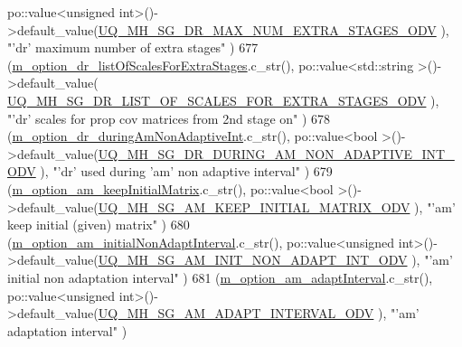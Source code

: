 \begin{DoxyCode}
      po::value<unsigned int>()->default\_value(\hyperlink{_metropolis_hastings_s_g_options_8h_a25f2d316e9719add171ab659591132a3}{UQ\_MH\_SG\_DR\_MAX\_NUM\_EXTRA\_STAGES\_ODV}       
                        ), \textcolor{stringliteral}{"'dr' maximum number of extra stages"}                        )
677     (\hyperlink{class_q_u_e_s_o_1_1_metropolis_hastings_s_g_options_a23025b02dde1763feed23f53a6549ac0}{m\_option\_dr\_listOfScalesForExtraStages}.c\_str(),              
      po::value<std::string >()->default\_value(
      \hyperlink{_metropolis_hastings_s_g_options_8h_a64c475d35150a5d123a7224c59f542b4}{UQ\_MH\_SG\_DR\_LIST\_OF\_SCALES\_FOR\_EXTRA\_STAGES\_ODV}             
       ), \textcolor{stringliteral}{"'dr' scales for prop cov matrices from 2nd stage on"}        )
678     (\hyperlink{class_q_u_e_s_o_1_1_metropolis_hastings_s_g_options_a86c8a503d026c8a112de8cfcb30e3a08}{m\_option\_dr\_duringAmNonAdaptiveInt}.c\_str(),                  
      po::value<bool        >()->default\_value(\hyperlink{_metropolis_hastings_s_g_options_8h_ab1c7c652caf08c08976fb716c0747136}{UQ\_MH\_SG\_DR\_DURING\_AM\_NON\_ADAPTIVE\_INT\_ODV}
                         ), \textcolor{stringliteral}{"'dr' used during 'am' non adaptive interval"}                )
679     (\hyperlink{class_q_u_e_s_o_1_1_metropolis_hastings_s_g_options_a1974e4434e6e24ce67198f122f20ab7c}{m\_option\_am\_keepInitialMatrix}.c\_str(),                       
      po::value<bool        >()->default\_value(\hyperlink{_metropolis_hastings_s_g_options_8h_a93d3172ebce0a72149c644a87dd9af85}{UQ\_MH\_SG\_AM\_KEEP\_INITIAL\_MATRIX\_ODV}         
                       ), \textcolor{stringliteral}{"'am' keep initial (given) matrix"}                           )
680     (\hyperlink{class_q_u_e_s_o_1_1_metropolis_hastings_s_g_options_a0293597878cab98eb6190ff67a0f3299}{m\_option\_am\_initialNonAdaptInterval}.c\_str(),                 
      po::value<unsigned int>()->default\_value(\hyperlink{_metropolis_hastings_s_g_options_8h_a21720d090f4803e013d42708851c436c}{UQ\_MH\_SG\_AM\_INIT\_NON\_ADAPT\_INT\_ODV}     
                            ), \textcolor{stringliteral}{"'am' initial non adaptation interval"}                       )
681     (\hyperlink{class_q_u_e_s_o_1_1_metropolis_hastings_s_g_options_aad5313349ed8553e95b0d867499b4cc9}{m\_option\_am\_adaptInterval}.c\_str(),                           
      po::value<unsigned int>()->default\_value(\hyperlink{_metropolis_hastings_s_g_options_8h_a77c8418223e86f075851bf910a36f91a}{UQ\_MH\_SG\_AM\_ADAPT\_INTERVAL\_ODV}                       
              ), \textcolor{stringliteral}{"'am' adaptation interval"}                                   )

\end{DoxyCode}
